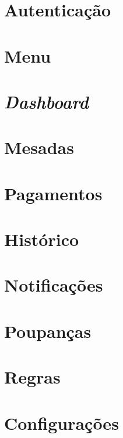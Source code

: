 \documentclass{article}
\begin{document}
  \pagebreak

  \section{Autenticação}  
  

  \section{Menu}  
  

  \section{\textit{Dashboard}}
  

  \section{Mesadas}
  

  \section{Pagamentos}
  

  \section{Histórico}
  

  \section{Notificações}
  

  \section{Poupanças}
  

  \section{Regras}
    

  \section{Configurações}
  \label{sec:conf}
  
\end{document}
